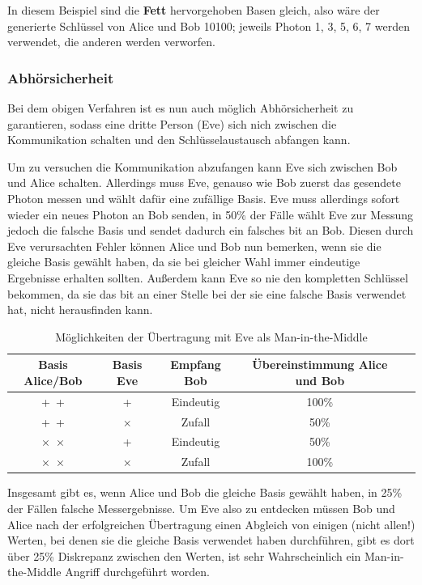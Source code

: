 In diesem Beispiel sind die \textbf{Fett} hervorgehoben Basen gleich, also wäre der generierte Schlüssel von Alice und Bob 10100; jeweils Photon 1, 3, 5, 6, 7 werden verwendet, die anderen werden verworfen.


\subsubsection{Abhörsicherheit}

Bei dem obigen Verfahren ist es nun auch möglich Abhörsicherheit zu garantieren, sodass eine dritte Person (Eve) sich nich zwischen die Kommunikation schalten und den Schlüsselaustausch abfangen kann.

Um zu versuchen die Kommunikation abzufangen kann Eve sich zwischen Bob und Alice schalten.
Allerdings muss Eve, genauso wie Bob zuerst das gesendete Photon messen und wählt dafür eine zufällige Basis.
Eve muss allerdings sofort wieder ein neues Photon an Bob senden, in 50\% der Fälle wählt Eve zur Messung jedoch die falsche Basis und sendet dadurch ein falsches bit an Bob.
Diesen durch Eve verursachten Fehler können Alice und Bob nun bemerken, wenn sie die gleiche Basis gewählt haben, da sie bei gleicher Wahl immer eindeutige Ergebnisse erhalten sollten.
Außerdem kann Eve so nie den kompletten Schlüssel bekommen, da sie das bit an einer Stelle bei der sie eine falsche Basis verwendet hat, nicht herausfinden kann.

\begin{table}[ht]
    \centering
    \begin{tabular}{|c|c|c|c|c|}
    \hline
    Basis Alice/Bob     & Basis Eve & Empfang Bob   & Übereinstimmung Alice und Bob \\ \hline
    +~+                 & +         & Eindeutig     & 100\% \\ \hline
    +~+                 & $\times$  & Zufall        & 50\%  \\ \hline 
    $\times$~$\times$   & +         & Eindeutig     & 50\%  \\ \hline
    $\times$~$\times$   & $\times$  & Zufall        & 100\% \\ \hline
    
    \end{tabular}
    \caption{Möglichkeiten der Übertragung mit Eve als Man-in-the-Middle \cite{quantenschluesselaustausch}}
    \label{table:eve-moeglichkeiten}
\end{table}

Insgesamt gibt es, wenn Alice und Bob die gleiche Basis gewählt haben, in 25\% der Fällen falsche Messergebnisse. 
Um Eve also zu entdecken müssen Bob und Alice nach der erfolgreichen Übertragung einen Abgleich von einigen (nicht allen!) Werten, bei denen sie die gleiche Basis verwendet haben durchführen, gibt es dort über 25\% Diskrepanz zwischen den Werten, ist sehr Wahrscheinlich ein Man-in-the-Middle Angriff durchgeführt worden.


